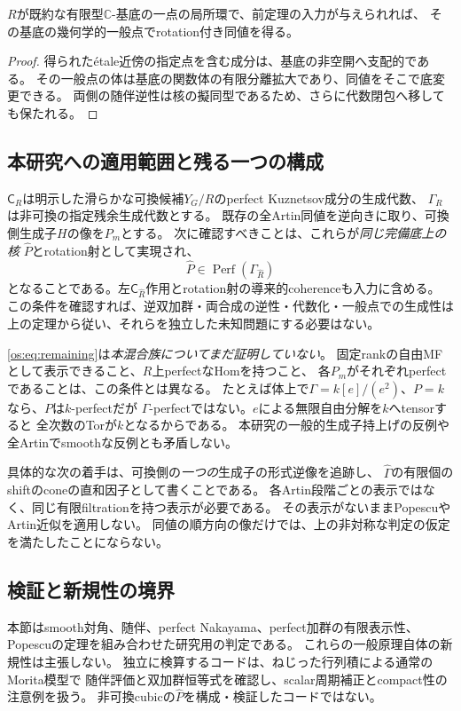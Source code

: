 \begin{corollary}[一般点への適用]\label{os:cor:generic}
$R$が既約な有限型$\mathbb C$-基底の一点の局所環で、前定理の入力が与えられれば、
その基底の幾何学的一般点でrotation付き同値を得る。
\end{corollary}
\begin{proof}
得られた\'etale近傍の指定点を含む成分は、基底の非空開へ支配的である。
その一般点の体は基底の関数体の有限分離拡大であり、同値をそこで底変更できる。
両側の随伴逆性は核の擬同型であるため、さらに代数閉包へ移しても保たれる。
\end{proof}

\subsection{本研究への適用範囲と残る一つの構成}

$\mathsf C_R$は明示した滑らかな可換候補$Y_G/R$のperfect Kuznetsov成分の生成代数、
$\Gamma_R$は非可換の指定残余生成代数とする。
既存の全Artin同値を逆向きに取り、可換側生成子$H$の像を$P_m$とする。
次に確認すべきことは、これらが\emph{同じ完備底上の核}
$\widehat P$とrotation射として実現され、
\[
 \boxed{\quad\widehat P\in\operatorname{Perf}(\Gamma_{\widehat R})\quad}
 \tag{OS8}\label{os:eq:remaining}
\]
となることである。左$\mathsf C_{\widehat R}$作用とrotation射の導来的coherenceも入力に含める。
この条件を確認すれば、逆双加群・両合成の逆性・代数化・一般点での生成性は
上の定理から従い、それらを独立した未知問題にする必要はない。

\eqref{os:eq:remaining}は\emph{本混合族についてまだ証明していない}。
固定rankの自由MFとして表示できること、$R$上perfectなHomを持つこと、
各$P_m$がそれぞれperfectであることは、この条件とは異なる。
たとえば体上で$\Gamma=k[e]/(e^2)$、$P=k$なら、$P$は$k$-perfectだが
$\Gamma$-perfectではない。$e$による無限自由分解を$k$へtensorすると
全次数のTorが$k$となるからである。
本研究の一般的生成子持上げの反例や全Artinでsmoothな反例とも矛盾しない。

具体的な次の着手は、可換側の\emph{一つの}生成子の形式逆像を追跡し、
$\widehat\Gamma$の有限個のshiftのconeの直和因子として書くことである。
各Artin段階ごとの表示ではなく、同じ有限filtrationを持つ表示が必要である。
その表示がないままPopescuやArtin近似を適用しない。
同値の順方向の像だけでは、上の非対称な判定の仮定を満たしたことにならない。

\subsection{検証と新規性の境界}

本節はsmooth対角、随伴、perfect Nakayama、perfect加群の有限表示性、
Popescuの定理を組み合わせた研究用の判定である。
これらの一般原理自体の新規性は主張しない。
独立に検算するコードは、ねじった行列積による通常のMorita模型で
随伴評価と双加群恒等式を確認し、scalar周期補正とcompact性の注意例を扱う。
非可換cubicの$\widehat P$を構成・検証したコードではない。
